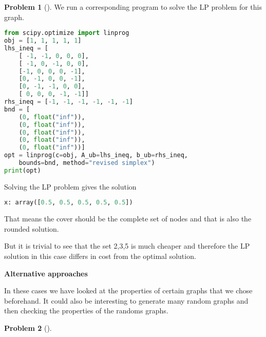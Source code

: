 \documentclass[11pt,twoside]{article}
\theoremstyle{definition}
\newtheorem{amsproblem}{Problem}
\newenvironment{problem}[1][]{%
  \begin{amsproblem}[#1]
  }{%
  \end{amsproblem}
}
\begin{document}
\begin{problem}
We run a corresponding program to solve the LP problem for this graph.

\begin{minipage}{\linewidth}%
\begin{lstlisting}[language=Python]
from scipy.optimize import linprog
obj = [1, 1, 1, 1, 1]
lhs_ineq = [
	[ -1, -1, 0, 0, 0],
	[ -1, 0, -1, 0, 0],
	[-1, 0, 0, 0, -1],
	[0, -1, 0, 0, -1],
	[0, -1, -1, 0, 0],
	[ 0, 0, 0, -1, -1]]
rhs_ineq = [-1, -1, -1, -1, -1, -1]
bnd = [
	(0, float("inf")),
	(0, float("inf")),
	(0, float("inf")),
	(0, float("inf")),
	(0, float("inf"))] 
opt = linprog(c=obj, A_ub=lhs_ineq, b_ub=rhs_ineq, 
	bounds=bnd, method="revised simplex")
print(opt)
\end{lstlisting}
\end{minipage}


Solving the LP problem gives the solution
\begin{lstlisting}[language=Python]
    x: array([0.5, 0.5, 0.5, 0.5, 0.5])
\end{lstlisting}


That means the cover should be the complete set of nodes and that is also the rounded solution.

But it is trivial to see that the set 2,3,5 is much cheaper and therefore the LP solution in this case differs in cost from the optimal solution.


\noindent \textbf{Alternative approaches}


In these cases we have looked at the properties of certain graphs that we chose beforehand. It could also be interesting to generate many random graphs and then checking the properties of the randoms graphs.

\end{problem}

\noindent
\hrulefill

\begin{problem}
 
\end{problem}


\end{document}
